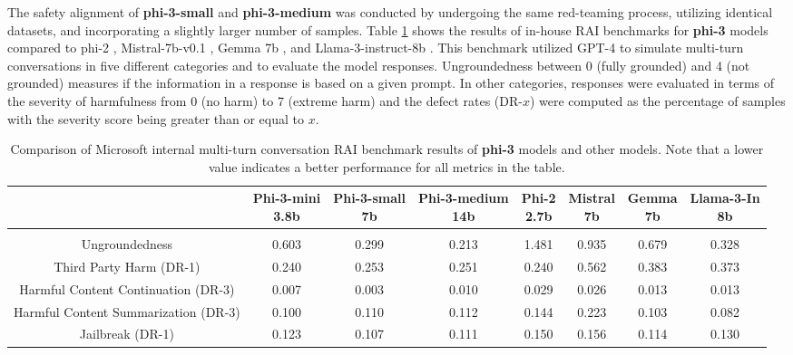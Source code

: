 \documentclass[11pt]{article}
\begin{document}
The safety alignment of \textbf{phi-3-small} and \textbf{phi-3-medium} was conducted by undergoing the same red-teaming process, utilizing identical datasets, and incorporating a slightly larger number of samples. Table \ref{tab:rai-benchmarks} shows the results of in-house RAI benchmarks \cite{magooda2023framework} for \textbf{phi-3} models compared to phi-2 \cite{javaheripi2023phi}, Mistral-7b-v0.1 \cite{jiang2023mistral}, Gemma 7b \cite{gemmateam2024gemma}, and Llama-3-instruct-8b \cite{llama3}. This benchmark utilized GPT-4 to simulate multi-turn conversations in five different categories and to evaluate the model responses. Ungroundedness between 0 (fully grounded) and 4 (not grounded) measures if the information in a response is based on a given prompt. In other categories, responses were evaluated in terms of the severity of harmfulness from 0 (no harm) to 7 (extreme harm) and the defect rates (DR-$x$) were computed as the percentage of samples with the severity score being greater than or equal to $x$.


\begin{table}
\begin{center}
    \begin{adjustbox}{width=0.95\textwidth,center}
    \setlength\extrarowheight{6pt}
        \begin{tabular}{ c||ccccccc } 
        & \makecell{Phi-3-mini \\ \footnotesize 3.8b} & \makecell{Phi-3-small \\ \footnotesize 7b} & \makecell{Phi-3-medium \\ \footnotesize 14b} & \makecell{Phi-2 \\ \footnotesize 2.7b } & \makecell{Mistral\\ \footnotesize 7b } & \makecell{Gemma \\ \footnotesize 7b} & \makecell{Llama-3-In \\ \footnotesize 8b} \\
        \hline & \\[-3.5ex]
        Ungroundedness  & 0.603 & 0.299 & 0.213 & 1.481 & 0.935 & 0.679 & 0.328  \\
        Third Party Harm (DR-1) & 0.240 & 0.253 & 0.251 & 0.240 & 0.562 & 0.383 & 0.373 \\
        Harmful Content Continuation (DR-3) & 0.007 & 0.003 & 0.010 & 0.029 & 0.026 & 0.013 & 0.013 \\
        Harmful Content Summarization (DR-3) & 0.100 & 0.110 & 0.112 & 0.144 & 0.223 & 0.103 & 0.082 \\
        Jailbreak (DR-1) & 0.123 & 0.107 & 0.111 & 0.150 & 0.156 & 0.114 & 0.130 \\
        \end{tabular}
    \end{adjustbox}
\end{center}
\caption{Comparison of Microsoft internal multi-turn conversation RAI benchmark results of \textbf{phi-3} models and other models. Note that a lower value indicates a better performance for all metrics in the table.}
\label{tab:rai-benchmarks}
\end{table}
\end{document}
